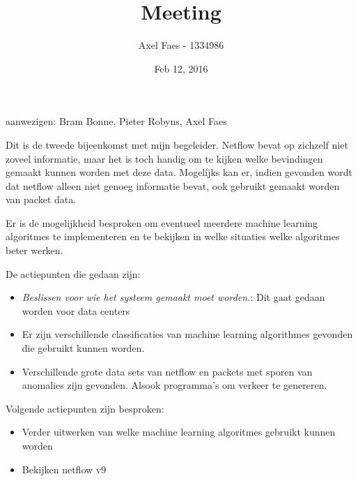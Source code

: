 \documentclass[notitlepage]{article}
\title{Meeting}
\author{Axel Faes - 1334986}
\date{Feb 12, 2016}
\begin{document}
\maketitle

aanwezigen: Bram Bonne, Pieter Robyns, Axel Faes

Dit is de tweede bijeenkomst met mijn begeleider. Netflow bevat op zichzelf niet zoveel informatie, maar het is toch handig om te kijken welke bevindingen gemaakt kunnen worden met deze data. Mogelijks kan er, indien gevonden wordt dat netflow alleen niet genoeg informatie bevat, ook gebruikt gemaakt worden van packet data. 

Er is de mogelijkheid besproken om eventueel meerdere machine learning algoritmes te implementeren en te bekijken in welke situaties welke algoritmes beter werken.

De actiepunten die gedaan zijn:
\begin{itemize}  
        \item \textit{Beslissen voor wie het systeem gemaakt moet worden.}: Dit gaat gedaan worden voor data centers
        \item Er zijn verschillende classificaties van machine learning algorithmes gevonden die gebruikt kunnen worden.
        \item Verschillende grote data sets van netflow en packets met sporen van anomalies zijn gevonden. Alsook programma's om verkeer te genereren.
\end{itemize}

Volgende actiepunten zijn besproken:
\begin{itemize}  
		\item Verder uitwerken van welke machine learning algoritmes gebruikt kunnen worden
        \item Bekijken netflow v9
\end{itemize}
\end{document}
